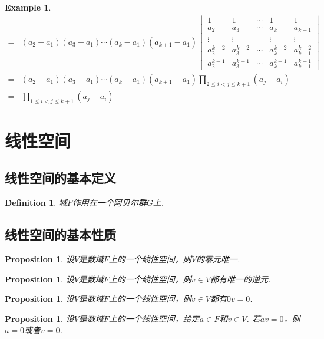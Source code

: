 \documentclass{article}
\newtheorem{proposition}[theorem]{Proposition}
\newtheorem{example}[theorem]{Example}
\newtheorem{definition}[theorem]{Definition}
\newcommand{\mbf}[1]{\bm{#1}}
\begin{document}
\begin{example}
$$\begin{array}{ll}
=& (a_2-a_1)(a_3-a_1)\cdots(a_k-a_1)(a_{k+1}-a_1)
\begin{vmatrix}
1 & 1& \cdots & 1 & 1\\
a_2 & a_3 & \cdots & a_k & a_{k+1} \\
\vdots & \vdots& &\vdots &\vdots \\
a_2^{k-2} & a_3^{k-2} & \cdots & a_k^{k-2} & a_{k-1}^{k-2} \\
a_2^{k-1} & a_3^{k-1} & \cdots & a_k^{k-1} & a_{k-1}^{k-1} 
\end{vmatrix} \\
=& (a_2-a_1)(a_3-a_1)\cdots(a_k-a_1)(a_{k+1}-a_1) \prod\limits_{2\leq i < j \leq k+1}(a_j - a_i) \\
=& \prod\limits_{1 \leq i < j \leq k+1}(a_j - a_i)
\end{array}
$$
\end{example}

\newpage
\section{线性空间}

\subsection{线性空间的基本定义}

\begin{definition}
\rm 域$F$作用在一个阿贝尔群$G$上.
\end{definition}

\subsection{线性空间的基本性质}

\begin{proposition}
\rm 设$V$是数域$F$上的一个线性空间，则$V$的零元唯一.
\end{proposition}


\begin{proposition}
\rm 设$V$是数域$F$上的一个线性空间，则$v \in V$都有唯一的逆元.
\end{proposition}

\begin{proposition}
\rm 设$V$是数域$F$上的一个线性空间，则$v \in V$都有$0v=0$.
\end{proposition}

\begin{proposition}
\rm 设$V$是数域$F$上的一个线性空间，给定$a \in F$和$v \in V$. 若$av = 0$，则$a = 0$或者$v=\mbf{0}$.
\end{proposition}
\end{document}
